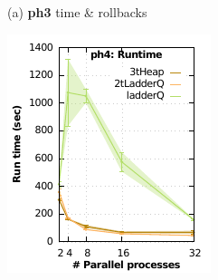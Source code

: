 \begin{figure}
\begin{minipage}{0.32\linewidth}
\begin{minipage}{0.49\linewidth}
\end{minipage}
\centerline{(a) \textbf{ph3} time \& rollbacks}
\end{minipage}
\begin{minipage}{0.32\linewidth}
\begin{minipage}{0.49\linewidth}
\includegraphics[width=\linewidth]{images/ph4_Delay_10_Evt_10_run_time}
\end{minipage}
\begin{minipage}{0.49\linewidth}

\end{minipage}
\end{minipage}
\end{figure}
